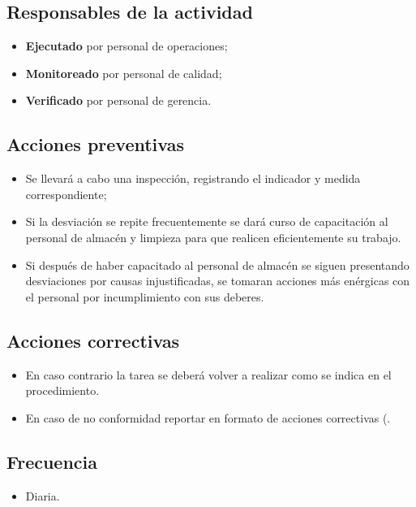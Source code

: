 \subsection{Responsables de la actividad}

\begin{itemize}
	\item \textbf{Ejecutado} por personal de operaciones;
	\item \textbf{Monitoreado} por personal de calidad;
	\item \textbf{Verificado} por personal de gerencia.
\end{itemize}

\subsection{Acciones preventivas}
\begin{itemize}
	\item Se llevará a cabo una inspección, registrando el indicador y medida correspondiente;
	\item Si la desviación se repite frecuentemente se dará curso de capacitación al personal de almacén y limpieza para que realicen eficientemente su trabajo.
	\item Si después de haber capacitado al personal de almacén se siguen presentando desviaciones por causas injustificadas, se tomaran acciones más enérgicas con el personal por incumplimiento con sus deberes.
\end{itemize}

\subsection{Acciones correctivas}

\begin{itemize}
	\item En caso contrario la tarea se deberá volver a realizar como se indica en el procedimiento.
	\item En caso de no conformidad reportar en formato de acciones correctivas (\RAC.
\end{itemize}

\subsection{Frecuencia}

\begin{itemize}
	\item Diaria.
\end{itemize}

